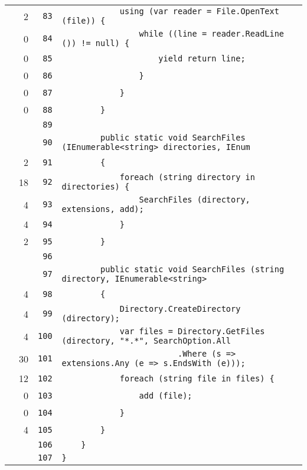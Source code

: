 \documentclass[a4paper,10pt]{article}
\begin{document}
\begin{longtable}[l]{lrrl}
\cellcolor{green} & 2 & \verb~83~ & \verb~            using (var reader = File.OpenText (file)) {~\\
\cellcolor{red} & 0 & \verb~84~ & \verb~                while ((line = reader.ReadLine ()) != null) {~\\
\cellcolor{red} & 0 & \verb~85~ & \verb~                    yield return line;~\\
\cellcolor{red} & 0 & \verb~86~ & \verb~                }~\\
\cellcolor{red} & 0 & \verb~87~ & \verb~            }~\\
\cellcolor{red} & 0 & \verb~88~ & \verb~        }~\\
\cellcolor{gray} &  & \verb~89~ & \verb~~\\
\cellcolor{gray} &  & \verb~90~ & \verb~        public static void SearchFiles (IEnumerable<string> directories, IEnum~\\
\cellcolor{green} & 2 & \verb~91~ & \verb~        {~\\
\cellcolor{green} & 18 & \verb~92~ & \verb~            foreach (string directory in directories) {~\\
\cellcolor{green} & 4 & \verb~93~ & \verb~                SearchFiles (directory, extensions, add);~\\
\cellcolor{green} & 4 & \verb~94~ & \verb~            }~\\
\cellcolor{green} & 2 & \verb~95~ & \verb~        }~\\
\cellcolor{gray} &  & \verb~96~ & \verb~~\\
\cellcolor{gray} &  & \verb~97~ & \verb~        public static void SearchFiles (string directory, IEnumerable<string> ~\\
\cellcolor{green} & 4 & \verb~98~ & \verb~        {~\\
\cellcolor{green} & 4 & \verb~99~ & \verb~            Directory.CreateDirectory (directory);~\\
\cellcolor{green} & 4 & \verb~100~ & \verb~            var files = Directory.GetFiles (directory, "*.*", SearchOption.All~\\
\cellcolor{green} & 30 & \verb~101~ & \verb~                        .Where (s => extensions.Any (e => s.EndsWith (e)));~\\
\cellcolor{green} & 12 & \verb~102~ & \verb~            foreach (string file in files) {~\\
\cellcolor{red} & 0 & \verb~103~ & \verb~                add (file);~\\
\cellcolor{red} & 0 & \verb~104~ & \verb~            }~\\
\cellcolor{green} & 4 & \verb~105~ & \verb~        }~\\
\cellcolor{gray} &  & \verb~106~ & \verb~    }~\\
\cellcolor{gray} &  & \verb~107~ & \verb~}~\\
\end{longtable}
\newpage
\end{document}
